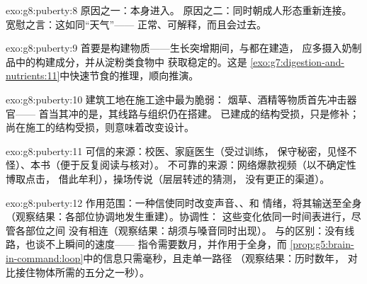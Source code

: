 \begin{solution}{exo:g8:puberty:8}
原因之一：本身进入。
原因之二：同时朝成人形态重新连接。
宽慰之言：这如同“天气”——
正常、可解释，而且会过去。
\end{solution}

\begin{solution}{exo:g8:puberty:9}
首要是构建物质——生长突增期间，与都在建造，
应多摄入奶制品中的构建成分，并从淀粉类食物中
获取稳定的。这是
\cref{exo:g7:digestion-and-nutrients:11}中快速节食的推理，顺向推演。
\end{solution}

\begin{solution}{exo:g8:puberty:10}
建筑工地在施工途中最为脆弱：
烟草、酒精等物质首先冲击器官——
首当其冲的是，其线路与组织仍在搭建。
已建成的结构受损，只是修补；
尚在施工的结构受损，则意味着改变设计。
\end{solution}

\begin{solution}{exo:g8:puberty:11}
可信的来源：校医、家庭医生（受过训练，
保守秘密，见怪不怪）、本书（便于反复阅读与核对）。
不可靠的来源：网络爆款视频（以不确定性博取点击，
借此牟利），操场传说（层层转述的猜测，
没有更正的渠道）。
\end{solution}

\begin{solution}{exo:g8:puberty:12}
作用范围：一种信使同时改变声音、、和
情绪，将其输送至全身
（观察结果：各部位协调地发生重建）。协调性：
这些变化依同一时间表进行，尽管各部位之间
没有相连（观察结果：胡须与嗓音同时出现）。
与的区别：没有线路，也谈不上瞬间的速度——
指令需要数月，并作用于全身，而
\cref{prop:g5:brain-in-command:loop}中的信息只需毫秒，且走单一路径
（观察结果：历时数年，
对比接住物体所需的五分之一秒）。
\end{solution}

